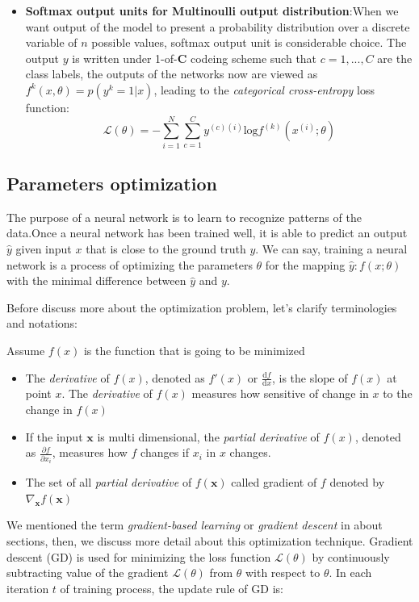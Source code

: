 \begin{itemize}
    \item \textbf{Softmax output units for Multinoulli output distribution}:When we want output of the model to present a probability distribution over a discrete variable of $n$ possible values, softmax output unit is considerable choice. The output $y$ is written under 1-of-\textbf{C} codeing scheme such that $c = 1,...,C$ are the class labels, the outputs of the networks now are viewed as $f^{k}(x,\theta) = p(y^{k}=1|x)$, leading to the \textit{categorical cross-entropy} loss function:
    \begin{equation}
        \mathcal{L}(\theta) = - \underset{i=1}{\overset{N}{\sum}}\underset{c=1}{\overset{C}{\sum}}y^{(c)(i)}\text{log}f^{(k)}(x^{(i)};\theta)
    \end{equation}
\end{itemize}
\subsection{Parameters optimization}
\hspace{0.5cm}The purpose of a neural network is to learn to recognize patterns of the data.Once a neural network has been trained well, it is able to predict an output $\hat{y}$ given input $x$ that is close to the ground truth $y$. We can say, training a neural network is a process of optimizing the parameters $\theta$ for the mapping $\hat{y} : f(x;\theta)$ with the minimal difference between $\hat{y}$ and $y$.\par
Before discuss more about the optimization problem, let's clarify terminologies and notations:\par
Assume $f(x)$ is the function that is going to be minimized
\begin{itemize}
    \item The \textit{derivative} of $f(x)$, denoted as $f'(x)$ or $\frac{\text{d}f}{\text{d}x}$, is the slope of $f(x)$ at point $x$. The \textit{derivative} of $f(x)$ measures how sensitive of change in $x$ to the change in $f(x)$
    \item If the input $\pmb{x}$ is multi dimensional, the \textit{partial derivative} of $f(x)$, denoted as $\frac{\partial f}{\partial x_i}$, measures how $f$ changes if $x_i$ in $x$ changes.
    \item The set of all \textit{partial derivative} of $f(\pmb{x})$ called gradient of $f$ denoted by $\nabla_{\pmb{x}} f(\pmb{x})$
\end{itemize}
\par We mentioned the term \textit{gradient-based learning} or \textit{gradient descent} in about sections, then, we discuss more detail about this optimization technique. Gradient descent (GD) is used for minimizing the loss function $\mathcal{L}(\theta)$ by continuously subtracting value of the gradient $\mathcal{L}(\theta)$ from $\theta$ with respect to $\theta$. In each iteration $t$ of training process, the update rule of GD is:
